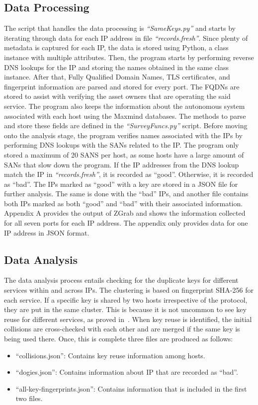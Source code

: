 \subsection{Data Processing}
The script that handles the data processing is \textit{``SameKeys.py''} and starts by iterating through data for each IP address in file \textit{``records.fresh''}. 
Since plenty of metadata is captured for each IP, the data is stored using Python, a class instance with multiple attributes. 
Then, the program starts by performing reverse DNS lookups for the IP and storing the names obtained in the same class instance. 
After that, Fully Qualified Domain Names, TLS certificates, and fingerprint information are parsed and stored for every port. 
The FQDNs are stored to assist with verifying the asset owners that are operating the said service. The program also keeps 
the information about the autonomous system associated with each host using the Maxmind databases. The methods to parse and store these 
fields are defined in the \textit{``SurveyFuncs.py''} script. Before moving onto the analysis stage, the program verifies names associated with the 
IPs by performing DNS lookups with the SANs related to the IP. The program only stored a maximum of 20 SANS per host, as some hosts have a large amount of SANs that 
slow down the program. If the IP addresses from the DNS lookup match the IP in \textit{``records.fresh''}, it is 
recorded as ``good''. Otherwise, it is recorded as ``bad''. The IPs marked as ``good'' with a key are stored in a JSON file for further analysis. 
The same is done with the ``bad'' IPs, and another file contains both IPs marked as both ``good'' and ``bad'' with their associated information. 
Appendix A provides the output of ZGrab and shows the information collected for all seven ports for each IP address. 
The appendix only provides data for one IP address in JSON format. 

\subsection{Data Analysis}
The data analysis process entails checking for the duplicate keys for different services within and across IPs. The clustering is based on fingerprint SHA-256 for each service. 
If a specific key is shared by two hosts irrespective of the protocol, they are put in the same cluster. This is because it is not uncommon to see key reuse for different services, as proved in~\cite{cryptoeprint:2018:299}. 
When key reuse is identified, the initial collisions are cross-checked with each other and are merged if the same key is being used there. 
Once, this is complete three files are produced as follows: 
\begin{itemize}
    \item ``collisions.json'': Contains key reuse information among hosts.
    \item ``dogies.json'': Contains information about IP that are recorded as ``bad''.
    \item  ``all-key-fingerprints.json'': Contains information that is included in the first two files. 
\end{itemize}

